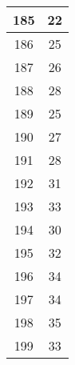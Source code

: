 \documentclass[letterpaper, 12pt]{article}
\begin{document}
\begin{longtable}{|c|c|}
\hline
185 & 22 \\
\hline
186 & 25 \\
\hline
187 & 26 \\
\hline
188 & 28 \\
\hline
189 & 25 \\
\hline
190 & 27 \\
\hline
191 & 28 \\
\hline
192 & 31 \\
\hline
193 & 33 \\
\hline
194 & 30 \\
\hline
195 & 32 \\
\hline
196 & 34 \\
\hline
197 & 34 \\
\hline
198 & 35 \\
\hline
199 & 33 \\
\hline
\end{longtable}
\end{document}
